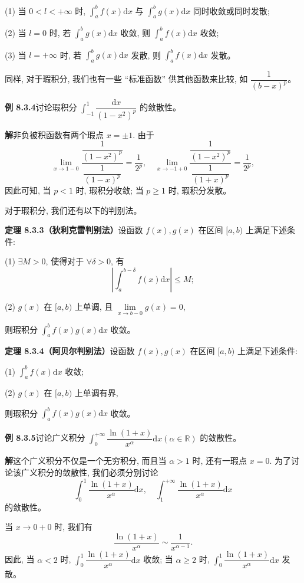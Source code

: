 \documentclass[UTF8, 12pt, fontset=fandol, oneside]{ctexart}
\begin{document}
(1) 当 $0<l<+\infty$ 时, $\int_a^b f(x)\mathrm dx$ 与 $\int_a^b g(x)\mathrm dx$ 同时收敛或同时发散;

(2) 当 $l=0$ 时, 若 $\int_a^b g(x)\mathrm dx$ 收敛, 则 $\int_a^b f(x)\mathrm dx$ 收敛;

(3) 当 $l=+\infty$ 时, 若 $\int_a^b g(x)\mathrm dx$ 发散, 则 $\int_a^b f(x)\mathrm dx$ 发散。

同样, 对于瑕积分, 我们也有一些 ``标准函数'' 供其他函数来比较, 如 $\dfrac1{(b-x)^p}$。

\noindent\textbf{例 8.3.4}\quad 讨论瑕积分 $\int_{-1}^1\dfrac{\mathrm dx}{(1-x^2)^p}$ 的敛散性。

\noindent\textbf{解}\quad 非负被积函数有两个瑕点 $x=\pm1$. 由于
\[
  \lim_{x\to1-0}
  \frac{\dfrac1{(1-x^2)^p}}{\dfrac1{(1-x)^p}}
  =
  \frac1{2^p},\quad
  \lim_{x\to-1+0}
  \frac{\dfrac1{(1-x^2)^p}}{\dfrac1{(1+x)^p}}
  =
  \frac1{2^p},
\]
因此可知, 当 $p<1$ 时, 瑕积分收敛; 当 $p\geq1$ 时, 瑕积分发散。

对于瑕积分, 我们还有以下的判别法。

\noindent\textbf{定理 8.3.3（狄利克雷判别法）}\quad 设函数 $f(x),g(x)$ 在区间 $[a,b)$ 上满足下述条件:

(1) $\exists M>0$, 使得对于 $\forall\delta>0$, 有
\[
  \left|\int_a^{b-\delta}f(x)\mathrm dx\right|\leq M;
\]

(2) $g(x)$ 在 $[a,b)$ 上单调, 且 $\lim\limits_{x\to b-0}g(x)=0$,

则瑕积分 $\int_a^b f(x)g(x)\mathrm dx$ 收敛。

\noindent\textbf{定理 8.3.4（阿贝尔判别法）}\quad 设函数 $f(x),g(x)$ 在区间 $[a,b)$ 上满足下述条件:

(1) $\int_a^b f(x)\mathrm dx$ 收敛;

(2) $g(x)$ 在 $[a,b)$ 上单调有界,

则瑕积分 $\int_a^b f(x)g(x)\mathrm dx$ 收敛。

\noindent\textbf{例 8.3.5}\quad 讨论广义积分 $\int_0^{+\infty}\dfrac{\ln(1+x)}{x^\alpha}\mathrm dx(\alpha\in\mathbb R)$ 的敛散性。

\noindent\textbf{解}\quad 这个广义积分不仅是一个无穷积分, 而且当 $\alpha>1$ 时, 还有一瑕点 $x=0$. 为了讨论该广义积分的敛散性, 我们必须分别讨论
\[
  \int_0^1\frac{\ln(1+x)}{x^\alpha}\mathrm dx,\quad
  \int_1^{+\infty}\frac{\ln(1+x)}{x^\alpha}\mathrm dx
\]
的敛散性。

当 $x\to0+0$ 时, 我们有
\[
  \frac{\ln(1+x)}{x^\alpha}\sim\frac1{x^{\alpha-1}}.
\]
因此, 当 $\alpha<2$ 时, $\int_0^1\dfrac{\ln(1+x)}{x^\alpha}\mathrm dx$ 收敛; 当 $\alpha\geq2$ 时, $\int_0^1\dfrac{\ln(1+x)}{x^\alpha}\mathrm dx$ 发散。
\end{document}
